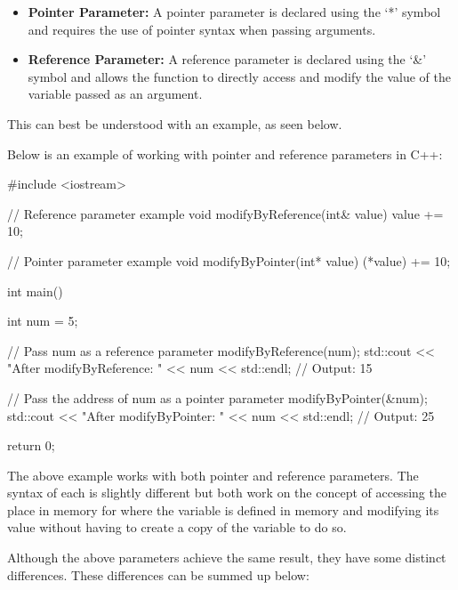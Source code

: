 \begin{itemize}
    \item \textbf{Pointer Parameter:} A pointer parameter is declared using the `*' symbol and requires the use of pointer syntax when passing arguments.
    \item \textbf{Reference Parameter:} A reference parameter is declared using the `\&' symbol and allows the function to directly access and modify the value of the variable passed as an argument.
\end{itemize}

\noindent This can best be understood with an example, as seen below.

\begin{highlight}
    
Below is an example of working with pointer and reference parameters in C++:

\begin{code}
#include <iostream>

// Reference parameter example
void modifyByReference(int& value) {
    value += 10;
}

// Pointer parameter example
void modifyByPointer(int* value) {
    (*value) += 10;
}

int main() {
    int num = 5;

    // Pass num as a reference parameter
    modifyByReference(num);
    std::cout << "After modifyByReference: " << num << std::endl;  // Output: 15

    // Pass the address of num as a pointer parameter
    modifyByPointer(&num);
    std::cout << "After modifyByPointer: " << num << std::endl;    // Output: 25

    return 0;
}    
\end{code}

The above example works with both pointer and reference parameters. The syntax of each is slightly different but both work on the concept of accessing the place in memory for where the variable is
defined in memory and modifying its value without having to create a copy of the variable to do so.

\end{highlight}

Although the above parameters achieve the same result, they have some distinct differences. These differences can be summed up below:

